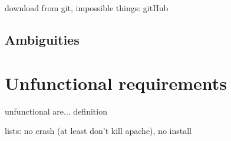 download from git,
impossible things: gitHub

\subsection{Ambiguities}


\section{Unfunctional requirements}
unfunctional are... definition%

lists:
no crash (at least don't kill apache), no install

\